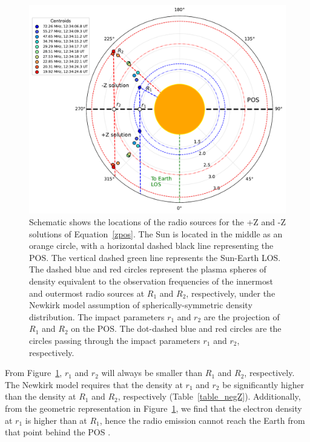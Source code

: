 \begin{figure}[h!]
	\centering
	\includegraphics[width=0.8\hsize]{chapter3/figs/negZ_posZ_solutions.pdf}
	\caption{Schematic shows the locations of the radio sources for the +Z and -Z solutions of Equation~\ref{zpos}. The Sun is located in the middle as an orange circle, with a horizontal dashed black line representing the POS. The vertical dashed green line represents the Sun-Earth LOS. The dashed blue and red circles represent the plasma spheres of density equivalent to the observation frequencies of the innermost and outermost radio sources at $R_1$ and $R_2$, respectively, under the Newkirk model assumption of spherically-symmetric density distribution. The impact parameters $r_1$ and $r_2$ are the projection of $R_1$ and $R_2$ on the POS. The dot-dashed blue and red circles are the circles passing through the impact parameters $r_1$ and $r_2$, respectively.}
	\label{fig_negZ_posZ}
\end{figure}
From Figure~\ref{fig_negZ_posZ}, $r_1$ and $r_2$ will always be smaller than $R_1$ and $R_2$, respectively. The Newkirk model requires that the density at $r_1$ and $r_2$ be significantly higher than the density at $R_1$ and $R_2$, respectively (Table~\ref{table_negZ}). Additionally, from the geometric representation in Figure~\ref{fig_negZ_posZ}, we find that the electron density at $r_1$ is higher than at ${R_1}$, hence the radio emission cannot reach the Earth from that point behind the POS \citep{mann_2018}.

